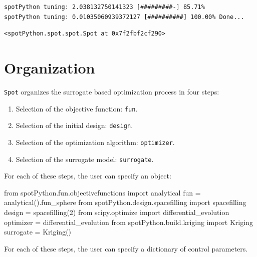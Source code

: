 \documentclass[
  letterpaper,
  DIV=11,
  numbers=noendperiod]{scrreprt}
\newenvironment{Shaded}{\begin{snugshade}}{\end{snugshade}}
\newcommand{\DecValTok}[1]{\textcolor[rgb]{0.68,0.00,0.00}{#1}}
\newcommand{\ImportTok}[1]{\textcolor[rgb]{0.00,0.46,0.62}{#1}}
\newcommand{\NormalTok}[1]{\textcolor[rgb]{0.00,0.23,0.31}{#1}}
\newcommand{\OperatorTok}[1]{\textcolor[rgb]{0.37,0.37,0.37}{#1}}
\providecommand{\tightlist}{%
  \setlength{\itemsep}{0pt}\setlength{\parskip}{0pt}}\usepackage{longtable,booktabs,array}
\begin{document}
\begin{verbatim}
spotPython tuning: 2.038132750141323 [#########-] 85.71% 
spotPython tuning: 0.01035060939372127 [##########] 100.00% Done...
\end{verbatim}

\begin{verbatim}
<spotPython.spot.spot.Spot at 0x7f2fbf2cf290>
\end{verbatim}

\section{Organization}\label{organization}

\texttt{Spot} organizes the surrogate based optimization process in four
steps:

\begin{enumerate}
\def\labelenumi{\arabic{enumi}.}
\tightlist
\item
  Selection of the objective function: \texttt{fun}.
\item
  Selection of the initial design: \texttt{design}.
\item
  Selection of the optimization algorithm: \texttt{optimizer}.
\item
  Selection of the surrogate model: \texttt{surrogate}.
\end{enumerate}

For each of these steps, the user can specify an object:

\begin{Shaded}
\begin{Highlighting}[]
\ImportTok{from}\NormalTok{ spotPython.fun.objectivefunctions }\ImportTok{import}\NormalTok{ analytical}
\NormalTok{fun }\OperatorTok{=}\NormalTok{ analytical().fun\_sphere}
\ImportTok{from}\NormalTok{ spotPython.design.spacefilling }\ImportTok{import}\NormalTok{ spacefilling}
\NormalTok{design }\OperatorTok{=}\NormalTok{ spacefilling(}\DecValTok{2}\NormalTok{)}
\ImportTok{from}\NormalTok{ scipy.optimize }\ImportTok{import}\NormalTok{ differential\_evolution}
\NormalTok{optimizer }\OperatorTok{=}\NormalTok{ differential\_evolution}
\ImportTok{from}\NormalTok{ spotPython.build.kriging }\ImportTok{import}\NormalTok{ Kriging}
\NormalTok{surrogate }\OperatorTok{=}\NormalTok{ Kriging()}
\end{Highlighting}
\end{Shaded}

For each of these steps, the user can specify a dictionary of control
parameters.
\end{document}
